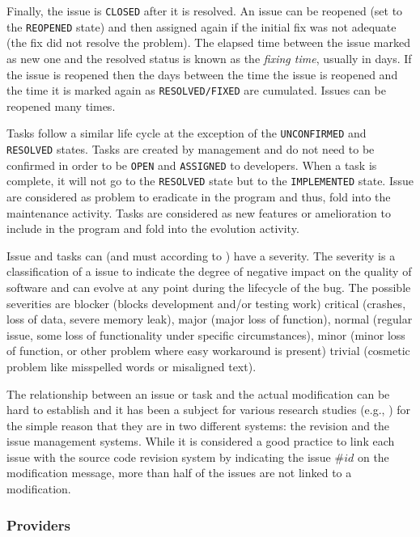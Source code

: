 Finally, the issue is {\tt CLOSED} after it is resolved.
An issue can be reopened (set to the {\tt REOPENED} state) and then assigned again if the initial fix was not adequate (the fix did not resolve the problem). The elapsed time between the issue marked as new one and the resolved status is known as the {\it fixing time}, usually in days.
If the issue is reopened then the days between the time the issue is reopened and the time it is marked again as {\tt RESOLVED/FIXED} are cumulated. Issues can be reopened many times.

Tasks follow a similar life cycle at the exception of the {\tt UNCONFIRMED} and {\tt RESOLVED} states.
Tasks are created by management and do not need to be confirmed in order to be {\tt OPEN} and {\tt ASSIGNED} to developers.
When a task is complete, it will not go to the {\tt RESOLVED} state but to the {\tt IMPLEMENTED} state.
Issue are considered as problem to eradicate in the program and thus, fold into the maintenance activity.
Tasks are considered as new features or amelioration to include in the program and fold into the evolution activity.

Issue and tasks can (and must according to \cite{Bettenburg2008}) have a
severity. The severity is a classification of a issue to indicate the
degree of negative impact on the quality of software and can
evolve at any point during the lifecycle of the bug. The possible severities are blocker (blocks
development and/or testing work) critical (crashes, loss of
data, severe memory leak), major (major loss of function),
normal (regular issue, some loss of functionality under
specific circumstances), minor (minor loss of function, or
other problem where easy workaround is present) trivial
(cosmetic problem like misspelled words or misaligned text).


The relationship between an issue or task and the actual modification can be hard to establish and it has been a subject for various research studies (e.g., \cite{Antoniol2002,Bachmann2010,Wu2011}) for the simple reason that they are in two different systems: the revision and the issue management systems. While it is considered a good practice to link each issue with the source code revision system by indicating the issue $\#id$ on the modification message, more than half of the issues are not linked to a modification.


\subsubsection{Providers\label{sec:bug-provider}}

